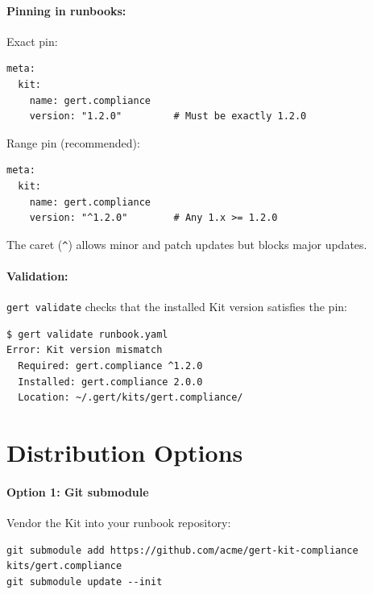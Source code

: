 \paragraph{Pinning in runbooks:}

Exact pin:

\begin{verbatim}
meta:
  kit:
    name: gert.compliance
    version: "1.2.0"         # Must be exactly 1.2.0
\end{verbatim}

Range pin (recommended):

\begin{verbatim}
meta:
  kit:
    name: gert.compliance
    version: "^1.2.0"        # Any 1.x >= 1.2.0
\end{verbatim}

The caret (\texttt{\^}) allows minor and patch updates but blocks major updates.

\paragraph{Validation:}

\texttt{gert validate} checks that the installed Kit version satisfies the pin:

\begin{verbatim}
$ gert validate runbook.yaml
Error: Kit version mismatch
  Required: gert.compliance ^1.2.0
  Installed: gert.compliance 2.0.0
  Location: ~/.gert/kits/gert.compliance/
\end{verbatim}

\section{Distribution Options}
\label{sec:distribution-options}

\paragraph{Option 1: Git submodule}

Vendor the Kit into your runbook repository:

\begin{verbatim}
git submodule add https://github.com/acme/gert-kit-compliance kits/gert.compliance
git submodule update --init
\end{verbatim}

